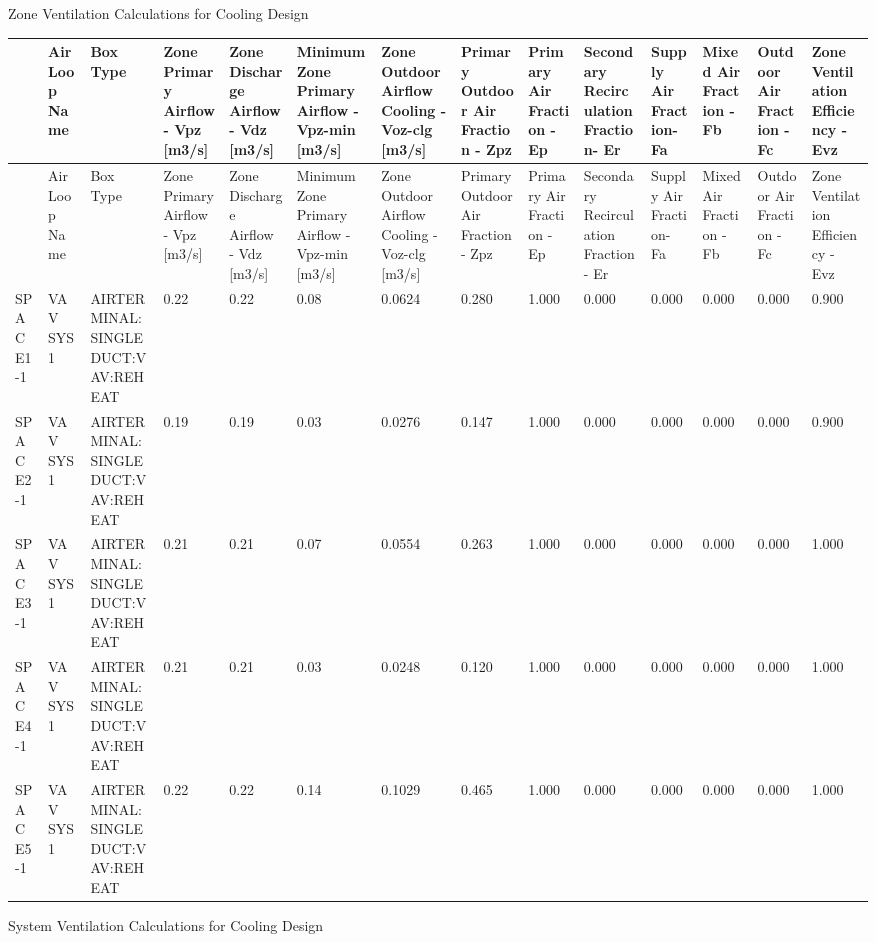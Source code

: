 Zone Ventilation Calculations for Cooling Design

{\tiny
\begin{longtable}[c]{p{0.42in}p{0.42in}p{0.42in}p{0.42in}p{0.42in}p{0.42in}p{0.42in}p{0.42in}p{0.42in}p{0.42in}p{0.42in}p{0.42in}p{0.42in}p{0.42in}}
\toprule 
 & AirLoop Name & Box Type & Zone Primary Airflow - Vpz [m3/s] & Zone Discharge Airflow - Vdz [m3/s] & Minimum Zone Primary Airflow - Vpz-min [m3/s] & Zone Outdoor Airflow Cooling - Voz-clg [m3/s] & Primary Outdoor Air Fraction - Zpz & Primary Air Fraction - Ep & Secondary Recirculation Fraction- Er & Supply Air Fraction- Fa & Mixed Air Fraction - Fb & Outdoor Air Fraction - Fc & Zone Ventilation Efficiency - Evz \tabularnewline
\midrule
\endfirsthead

\toprule 
 & AirLoop Name & Box Type & Zone Primary Airflow - Vpz [m3/s] & Zone Discharge Airflow - Vdz [m3/s] & Minimum Zone Primary Airflow - Vpz-min [m3/s] & Zone Outdoor Airflow Cooling - Voz-clg [m3/s] & Primary Outdoor Air Fraction - Zpz & Primary Air Fraction - Ep & Secondary Recirculation Fraction- Er & Supply Air Fraction- Fa & Mixed Air Fraction - Fb & Outdoor Air Fraction - Fc & Zone Ventilation Efficiency - Evz \tabularnewline
\midrule
\endhead

SPACE1-1 & VAV SYS 1 & AIRTERMINAL\-:SINGLEDUCT\-:VAV\-:REHEAT & 0.22 & 0.22 & 0.08 & 0.0624 & 0.280 & 1.000 & 0.000 & 0.000 & 0.000 & 0.000 & 0.900 \tabularnewline
SPACE2-1 & VAV SYS 1 & AIRTERMINAL\-:SINGLEDUCT\-:VAV\-:REHEAT & 0.19 & 0.19 & 0.03 & 0.0276 & 0.147 & 1.000 & 0.000 & 0.000 & 0.000 & 0.000 & 0.900 \tabularnewline
SPACE3-1 & VAV SYS 1 & AIRTERMINAL\-:SINGLEDUCT\-:VAV\-:REHEAT & 0.21 & 0.21 & 0.07 & 0.0554 & 0.263 & 1.000 & 0.000 & 0.000 & 0.000 & 0.000 & 1.000 \tabularnewline
SPACE4-1 & VAV SYS 1 & AIRTERMINAL\-:SINGLEDUCT\-:VAV\-:REHEAT & 0.21 & 0.21 & 0.03 & 0.0248 & 0.120 & 1.000 & 0.000 & 0.000 & 0.000 & 0.000 & 1.000 \tabularnewline
SPACE5-1 & VAV SYS 1 & AIRTERMINAL\-:SINGLEDUCT\-:VAV\-:REHEAT & 0.22 & 0.22 & 0.14 & 0.1029 & 0.465 & 1.000 & 0.000 & 0.000 & 0.000 & 0.000 & 1.000 \tabularnewline
\bottomrule
\end{longtable}}

System Ventilation Calculations for Cooling Design


